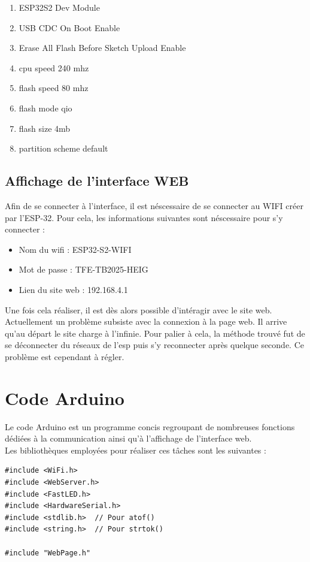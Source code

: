 \begin{enumerate}
  \item ESP32S2 Dev Module
  \item USB CDC On Boot Enable
  \item Erase All Flash Before Sketch Upload Enable
  \item cpu speed 240 mhz
  \item flash speed 80 mhz
  \item flash mode qio
  \item flash size 4mb
  \item partition scheme default
\end{enumerate}



\subsection{Affichage de l'interface WEB}
Afin de se connecter à l'interface, il est néscessaire de se connecter au WIFI créer par l'ESP-32. Pour cela, les informations suivantes sont néscessaire pour s'y connecter :

\begin{itemize}
  \item Nom du wifi : ESP32-S2-WIFI
  \item Mot de passe : TFE-TB2025-HEIG
  \item Lien du site web : 192.168.4.1
\end{itemize}

Une fois cela réaliser, il est dès alors possible d'intéragir avec le site web.\\

Actuellement un problème subsiste avec la connexion à la page web. Il arrive qu'au départ le site charge à l'infinie. Pour palier à cela, la méthode trouvé fut de se déconnecter du réseaux de l'esp puis s'y reconnecter après quelque seconde. Ce problème est cependant à régler.

\section{Code Arduino}
Le code Arduino est un programme concis regroupant de nombreuses fonctions dédiées à la communication ainsi qu'à l'affichage de l'interface web.\\

Les bibliothèques employées pour réaliser ces tâches sont les suivantes :

\begin{verbatim}
#include <WiFi.h>
#include <WebServer.h>
#include <FastLED.h>
#include <HardwareSerial.h>
#include <stdlib.h>  // Pour atof()
#include <string.h>  // Pour strtok()

#include "WebPage.h"
\end{verbatim}


